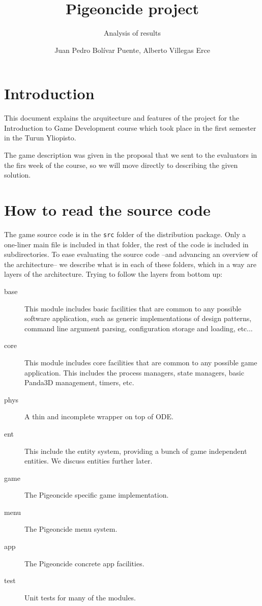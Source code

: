 \documentclass[a4paper,10pt]{article}
\title{Pigeoncide project}
\subtitle{Analysis of results}
\author{Juan Pedro Bolívar Puente, Alberto Villegas Erce}
\begin{document}
\raskolnikovmaketitle
\tableofcontents


\section{Introduction}

This document explains the arquitecture and features of the project
for the Introduction to Game Development course which took place in
the first semester in the Turun Yliopisto.

The game description was given in the proposal that we sent to the
evaluators in the firs week of the course, so we will move directly to
describing the given solution.

\section{How to read the source code}

The game source code is in the \texttt{src} folder of the distribution
package. Only a one-liner main file is included in that folder, the
rest of the code is included in subdirectories. To ease evaluating the
source code --and advancing an overview of the architecture-- we
describe what is in each of these folders, which in a way are layers
of the architecture. Trying to follow the layers from bottom up:

\begin{description}
\item[base] This module includes basic facilities that are common to
  any possible software application, such as generic implementations
  of design patterns, command line argument parsing, configuration
  storage and loading, etc...

\item[core] This module includes core facilities that are common to
  any possible game application. This includes the process managers,
  state managers, basic Panda3D management, timers, etc.

\item[phys] A thin and incomplete wrapper on top of ODE.

\item[ent] This include the entity system, providing a bunch of game
  independent entities. We discuss entities further later.

\item[game] The Pigeoncide specific game implementation.

\item[menu] The Pigeoncide menu system.

\item[app] The Pigeoncide concrete app facilities.

\item[test] Unit tests for many of the modules.

\end{description}
\end{document}
